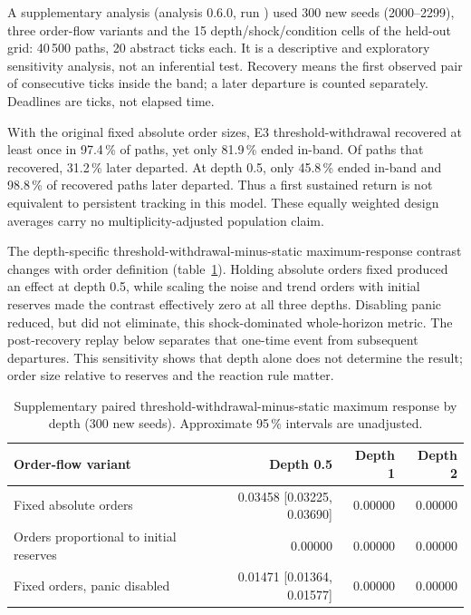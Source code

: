 A supplementary analysis (analysis 0.6.0, run \code{\EngineeringRunID}) used 300 new seeds (2000--2299), three order-flow variants and the 15 depth/shock/condition cells of the held-out grid: 40\,500 paths, 20 abstract ticks each. It is a descriptive and exploratory sensitivity analysis, not an inferential test. Recovery means the first observed pair of consecutive ticks inside the band; a later departure is counted separately. Deadlines are ticks, not elapsed time.

With the original fixed absolute order sizes, E3 threshold-withdrawal recovered at least once in 97.4\,\% of paths, yet only 81.9\,\% ended in-band. Of paths that recovered, 31.2\,\% later departed. At depth 0.5, only 45.8\,\% ended in-band and 98.8\,\% of recovered paths later departed. Thus a first sustained return is not equivalent to persistent tracking in this model. These equally weighted design averages carry no multiplicity-adjusted population claim.

The depth-specific threshold-withdrawal-minus-static maximum-response contrast changes with order definition (table~\ref{tab:engineering-sensitivity}). Holding absolute orders fixed produced an effect at depth 0.5, while scaling the noise and trend orders with initial reserves made the contrast effectively zero at all three depths. Disabling panic reduced, but did not eliminate, this shock-dominated whole-horizon metric. The post-recovery replay below separates that one-time event from subsequent departures. This sensitivity shows that depth alone does not determine the result; order size relative to reserves and the reaction rule matter.

\begin{table}[htbp]
\centering
\caption{Supplementary paired threshold-withdrawal-minus-static maximum response by depth (300 new seeds). Approximate 95\,\% intervals are unadjusted.}
\label{tab:engineering-sensitivity}
\small
\begin{tabular}{@{}lrrr@{}}
\toprule
Order-flow variant & Depth 0.5 & Depth 1 & Depth 2 \\
\midrule
Fixed absolute orders & 0.03458 [0.03225, 0.03690] & 0.00000 & 0.00000 \\
Orders proportional to initial reserves & 0.00000 & 0.00000 & 0.00000 \\
Fixed orders, panic disabled & 0.01471 [0.01364, 0.01577] & 0.00000 & 0.00000 \\
\bottomrule
\end{tabular}
\end{table}


